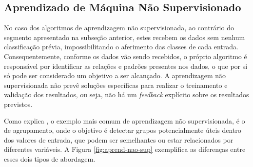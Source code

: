 \documentclass[oneside,openright,12pt]{ufsm_2015} %
\begin{document}

\subsection{Aprendizado de Máquina Não Supervisionado}
\label{sec:aprend-maquina-nao-sup}

    \par No caso dos algoritmos de aprendizagem não supervisionada, ao contrário do segmento apresentado na subseção anterior, estes recebem os dados sem nenhum classificação prévia, impossibilitando o aferimento das classes de cada entrada. Consequentemente, conforme os dados vão sendo recebidos, o próprio algoritmo é responsável por identificar as relações e padrões presentes nos dados, o que por si só pode ser considerado um objetivo a ser alcançado. A aprendizagem não supervisionada não prevê soluções específicas para realizar o treinamento e validação dos resultados, ou seja, não há um \textit{feedback} explícito sobre os resultados previstos.

    \par Como explica \cite{book:russell:10}, o exemplo mais comum de aprendizagem não supervisionada, é o de agrupamento, onde o objetivo é detectar grupos potencialmente úteis dentro dos valores de entrada, que podem ser semelhantes ou estar relacionados por diferentes variáveis. A Figura \ref{fig:aprend-nao-sup} exemplifica as diferenças entre esses dois tipos de abordagem.
\end{document}
